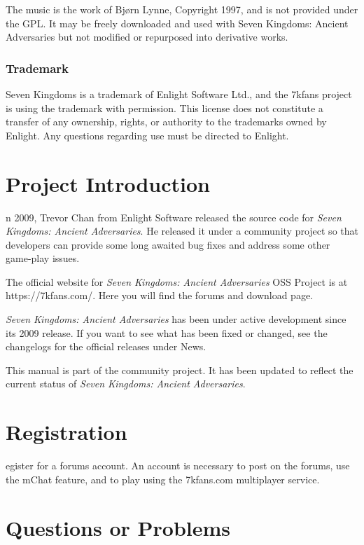 \documentclass[openany]{book}
\begin{document}
The music is the work of Bjørn Lynne, Copyright 1997, and is not provided under the GPL. It may be freely downloaded and used with Seven Kingdoms: Ancient Adversaries but not modified or repurposed into derivative works.

\subsubsection*{Trademark}

Seven Kingdoms is a trademark of Enlight Software Ltd., and the 7kfans project is using the trademark with permission. This license does not constitute a transfer of any ownership, rights, or authority to the trademarks owned by Enlight. Any questions regarding use must be directed to Enlight.

\clearpage

\section*{Project Introduction}

n 2009, Trevor Chan from Enlight Software released the source code for \textit{Seven Kingdoms: Ancient Adversaries}. He released it under a community project so that developers can provide some long awaited bug fixes and address some other game-play issues.

The official website for \textit{Seven Kingdoms: Ancient Adversaries} OSS Project is at https://7kfans.com/. Here you will find the forums and download page.

\textit{Seven Kingdoms: Ancient Adversaries} has been under active development since its 2009 release. If you want to see what has been fixed or changed, see the changelogs for the official releases under News.

This manual is part of the community project. It has been updated to reflect the current status of \textit{Seven Kingdoms: Ancient Adversaries}.

\section*{Registration}


egister for a forums account. An account is necessary to post on the forums, use the mChat feature, and to play using the 7kfans.com multiplayer service.

\section*{Questions or Problems}
\end{document}
